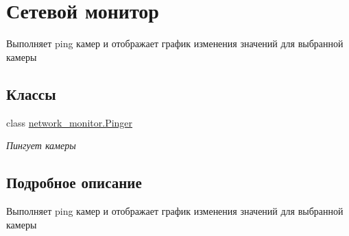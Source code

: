 \hypertarget{group__network__monitor}{}\section{Сетевой монитор}
\label{group__network__monitor}


Выполняет ping камер и отображает график изменения значений для выбранной камеры  


\subsection*{Классы}
\begin{DoxyCompactItemize}
\item 
class \hyperlink{classnetwork__monitor_1_1_pinger}{network\+\_\+monitor.\+Pinger}
\begin{DoxyCompactList}\small\item\em Пингует камеры \end{DoxyCompactList}\end{DoxyCompactItemize}


\subsection{Подробное описание}
Выполняет ping камер и отображает график изменения значений для выбранной камеры 

